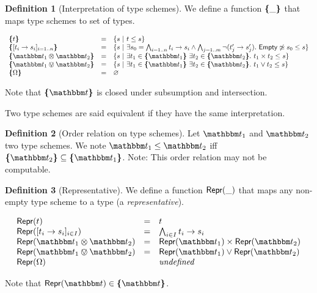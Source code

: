 \documentclass[a4paper]{article}
\theoremstyle{definition}
\newtheorem{definition}{Definition}
\begin{document}
    \begin{definition}[Interpretation of type schemes]
      We define a function $\textbf{\textup{\{}}\_\textbf{\textup{\}}}$ that maps type schemes to set of types.

      \begin{align*}
        \begin{array}{lcl}
        \tsint t &=& \{s\alt t \leq s\}\\
        \tsint {\tsfunone {t_i} {s_i}_{i=1..n}} &=& \{s\alt
        \exists s_0 = \bigwedge_{i=1..n} \arrow {t_i} {s_i}
        \land \bigwedge_{j=1..m} \neg (\arrow {t_j'} {s_j'}).\ 
        \Empty \not\simeq s_0 \leq s \}\\
        \tsint {\ts_1 \tstimes \ts_2} &=& \{s\alt \exists t_1 \in \tsint {\ts_1}\ 
        \exists t_2 \in \tsint {\ts_2}.\ \pair {t_1} {t_2} \leq s\}\\
        \tsint {\ts_1 \tsor \ts_2} &=& \{s\alt \exists t_1 \in \tsint {\ts_1}\ 
        \exists t_2 \in \tsint {\ts_2}.\ {t_1} \vee {t_2} \leq s\}\\
        \tsint \tsempty &=& \varnothing
        \end{array}
      \end{align*}

    Note that $\tsint \ts$ is closed under subsumption and intersection.
    
    Two type schemes are said equivalent if they have the same interpretation.
    \end{definition}
 
    \begin{definition}[Order relation on type schemes]
      Let $\ts_1$ and $\ts_2$ two type schemes.
      We note $\ts_1\leq\ts_2$ iff $\tsint {\ts_2} \subseteq \tsint {\ts_1}$.
      Note: This order relation may not be computable.
    \end{definition}

    \begin{definition}[Representative]
      We define a function $\textsf{Repr}(\_)$ that maps any non-empty type scheme to a type (a \textit{representative}).

      \begin{align*}
        \begin{array}{lcl}
        \tsrep t &=& t\\
        \tsrep {\tsfunone {t_i} {s_i}_{i\in I}} &=& \bigwedge_{i\in I} \arrow {t_i} {s_i}\\
        \tsrep {\ts_1 \tstimes \ts_2} &=& \pair {\tsrep {\ts_1}} {\tsrep {\ts_2}}\\
        \tsrep {\ts_1 \tsor \ts_2} &=& \tsrep {\ts_1} \vee \tsrep {\ts_2}\\
        \tsrep \tsempty && \textit{undefined}
        \end{array}
      \end{align*}

    Note that $\tsrep \ts \in \tsint \ts$.
    \end{definition}
\end{document}
